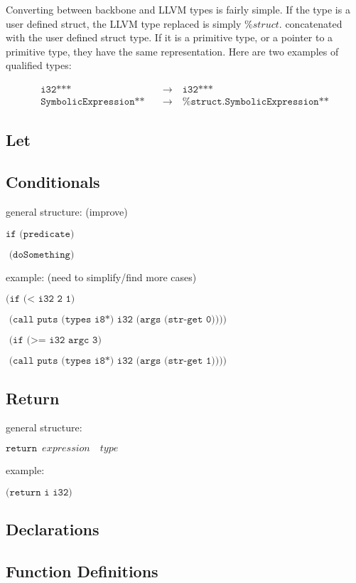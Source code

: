 \documentclass[journal=jacsat, manuscript=article]{achemso}
\begin{document}
Converting between backbone and LLVM types is fairly simple. If the type is a user defined struct,
the LLVM type replaced is simply $\%struct.$ concatenated with the user defined struct type. If it
is a primitive type, or a pointer to a primitive type, they have the same representation. Here
are two examples of qualified types:

\begin{align}
\texttt{i32***}\quad &\rightarrow \quad \texttt{i32***} \\
\texttt{SymbolicExpression**}\quad &\rightarrow\quad \texttt{\%struct.SymbolicExpression**}
\end{align}

\subsection{Let}


\subsection{Conditionals}

general structure: (improve)

$\texttt{if (predicate)}$

$\texttt{    (doSomething)}$

example: (need to simplify/find more cases)

$\texttt{(if (< i32 2 1)}$

$\texttt{     (call puts (types i8*) i32 (args (str-get 0))))}$

$\texttt{  (if (>= i32 argc 3)}$

$\texttt{     (call puts (types i8*) i32 (args (str-get 1))))}$

\subsection{Return}

general structure:

$\texttt{return}\,\,\,expression\,\,\,\,\,\,type\,\,\,$

example:

$\texttt{(return i i32)}$

\subsection{Declarations}
\subsection{Function Definitions}
\end{document}
